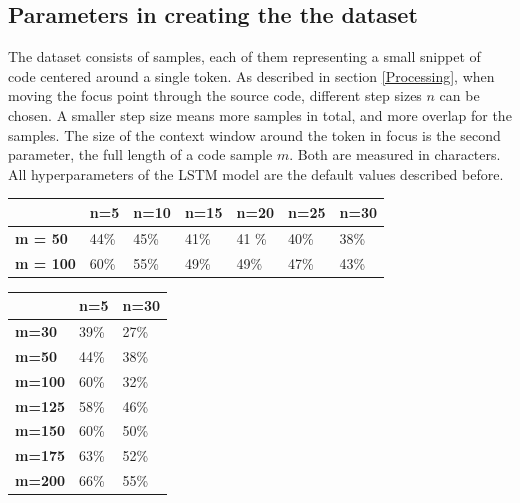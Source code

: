\documentclass[
a4paper,
pagesize,
pdftex,
12pt,
twoside, %
BCOR=5mm, %
ngerman,
fleqn,
final,
]{scrartcl}
\begin{document}
	\subsection{Parameters in creating the the dataset}
	
	The dataset consists of samples, each of them representing a small snippet of code centered around a single token. As described in section \ref{Processing}, when moving the focus point through the source code, different step sizes $n$ can be chosen. A smaller step size means more samples in total, and more overlap for the samples. The size of the context window around the token in focus is the second parameter, the full length of a code sample $m$. Both are measured in characters. All  hyperparameters of the LSTM model are the default values described before.
	
	\begin{tabular}{|p{2cm}||p{1.7cm}|p{1.7cm}|p{1.7cm}|p{1.7cm}|p{1.7cm}|p{1.7cm}|}
		\hline
		& \textbf{n=5} &\textbf{n=10} & \textbf{n=15} & \textbf{n=20} & \textbf{n=25} & \textbf{n=30} \\
		\hline
		\textbf{m = 50} & 44\% & 45\% &41\% &41 \%& 40\% & 38\% \\ 
		\textbf{m = 100} & 60\% & 55\% &49\% &49\%&  47\% &43\% \\
		\hline
		\hline
	\end{tabular}
	
	
	\begin{tabular}{|p{2cm}||p{1.7cm}|p{1.7cm}|}
		\hline  
		& \textbf{n=5} & \textbf{n=30} \\
		\hline
		\textbf{m=30} & 39\%& 27\% \\ 
		\textbf{m=50} & 44\%& 38\% \\ 
		\textbf{m=100} & 60\%& 32\% \\
		\textbf{m=125} & 58\%&46\% \\
		\textbf{m=150} & 60\%& 50\% \\
		\textbf{m=175} & 63\%&52\% \\
		\textbf{m=200} & 66\%& 55\%\\
		\hline
		\hline
	\end{tabular}
	
\end{document}
